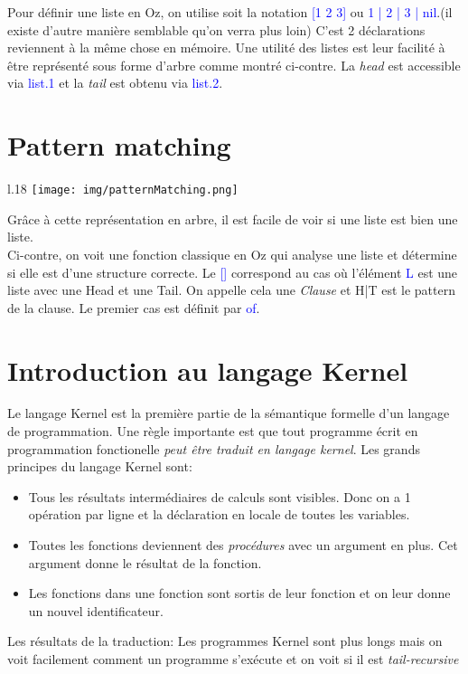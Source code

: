 \documentclass{report}
\begin{document}
Pour définir une liste en Oz, on utilise soit la notation \textcolor{blue}{[1 2 3]} ou \textcolor{blue}{1 | 2 | 3 | nil}.(il existe d'autre manière semblable qu'on verra plus loin) C'est 2 déclarations reviennent à la même chose en mémoire. Une utilité des listes est leur facilité à être représenté sous forme d'arbre comme montré ci-contre. La \textit{head} est accessible via \textcolor{blue}{list.1} et la \textit{tail} est obtenu via \textcolor{blue}{list.2}.

\section{Pattern matching}
\begin{wrapfigure}{l}{.18\textwidth}
	\centering
	\texttt{[image: img/patternMatching.png]}
\end{wrapfigure}
Grâce à cette représentation en arbre, il est facile de voir si une liste est bien une liste.\\
Ci-contre, on voit une fonction classique en Oz qui analyse une liste et détermine si elle est d'une structure correcte. Le \textcolor{blue}{[]} correspond au cas où l'élément \textcolor{blue}{L} est une liste avec une Head et une Tail. On appelle cela une \textit{Clause} et H|T est le pattern de la clause. Le premier cas est définit par \textcolor{blue}{of}.
\newpage

\section{Introduction au langage Kernel}
Le langage Kernel est la première partie de la sémantique formelle d'un langage de programmation. Une règle importante est que tout programme écrit en programmation fonctionelle \textit{peut être traduit en langage kernel}.
Les grands principes du langage Kernel sont:
\begin{itemize}
	\item Tous les résultats intermédiaires de calculs sont visibles. Donc on a 1 opération par ligne et la déclaration en locale de toutes les variables.
	\item Toutes les fonctions deviennent des \textit{procédures} avec un argument en plus. Cet argument donne le résultat de la fonction.
	\item Les fonctions dans une fonction sont sortis de leur fonction et on leur donne un nouvel identificateur.
\end{itemize}
Les résultats de la traduction: Les programmes Kernel sont plus longs mais on voit facilement comment un programme s'exécute et on voit si il est \textit{tail-recursive}
\end{document}
